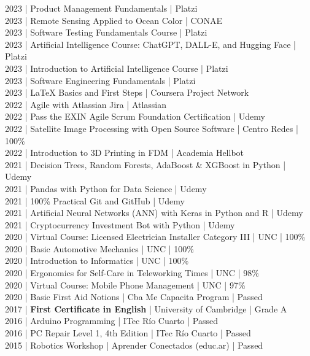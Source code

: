 {2023 | Product Management Fundamentals | Platzi \\
2023 | Remote Sensing Applied to Ocean Color | CONAE \\
2023 | Software Testing Fundamentals Course | Platzi \\
2023 | Artificial Intelligence Course: ChatGPT, DALL-E, and Hugging Face | Platzi \\
2023 | Introduction to Artificial Intelligence Course | Platzi \\
2023 | Software Engineering Fundamentals | Platzi \\
2023 | LaTeX Basics and First Steps | Coursera Project Network \\
2022 | Agile with Atlassian Jira | Atlassian \\
2022 | Pass the EXIN Agile Scrum Foundation Certification | Udemy \\
2022 | Satellite Image Processing with Open Source Software | Centro Redes | 100\% \\
2022 | Introduction to 3D Printing in FDM | Academia Hellbot \\
2021 | Decision Trees, Random Forests, AdaBoost \& XGBoost in Python | Udemy \\
2021 | Pandas with Python for Data Science | Udemy \\
2021 | 100\% Practical Git and GitHub | Udemy \\
2021 | Artificial Neural Networks (ANN) with Keras in Python and R | Udemy \\
2021 | Cryptocurrency Investment Bot with Python | Udemy \\
2020 | Virtual Course: Licensed Electrician Installer Category III | UNC | 100\% \\
2020 | Basic Automotive Mechanics | UNC | 100\% \\
2020 | Introduction to Informatics | UNC | 100\% \\
2020 | Ergonomics for Self-Care in Teleworking Times | UNC | 98\% \\
2020 | Virtual Course: Mobile Phone Management | UNC | 97\% \\
2020 | Basic First Aid Notions | Cba Me Capacita Program | Passed \\
2017 | \textbf{First Certificate in English} | University of Cambridge | Grade A \\
2016 | Arduino Programming | ITec Río Cuarto | Passed \\
2016 | PC Repair Level 1, 4th Edition | ITec Río Cuarto | Passed \\
2015 | Robotics Workshop | Aprender Conectados (educ.ar) | Passed \\
}

\vspace{12pt}